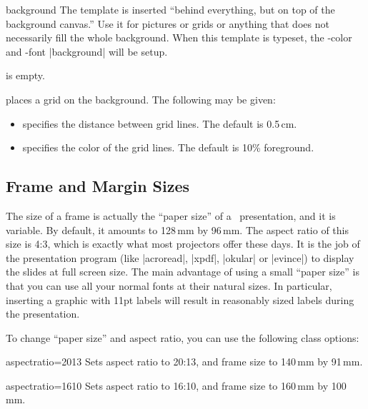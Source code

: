 \begin{element}{background}\yes\yes\yes
  The template is inserted ``behind everything, but on top of the background canvas.'' Use it for pictures or grids or anything that does not necessarily fill the whole background. When this template is typeset, the \beamer-color and -font |background| will be setup.

  \begin{templateoptions}
     is empty.

    places a grid on the background. The following  may be given:
    \begin{itemize}
      \item
       specifies the distance between grid lines. The default is 0.5\,cm.
      \item
       specifies the color of the grid lines. The default is 10\% foreground.
    \end{itemize}
  \end{templateoptions}
\end{element}


\subsection{Frame and Margin Sizes}

The size of a frame is actually the ``paper size'' of a \beamer\ presentation, and it is variable. By default, it amounts to 128\,mm by 96\,mm. The aspect ratio of this size is 4:3, which is exactly what most projectors offer these days. It is the job of the presentation program (like |acroread|, |xpdf|, |okular| or |evince|) to display the slides at full screen size. The main advantage of using a small ``paper size'' is that you can use all your normal fonts at their natural sizes. In particular, inserting a graphic with 11pt labels will result in reasonably sized labels during the presentation.

To change ``paper size'' and aspect ratio, you can use the following class options:

\begin{classoption}{aspectratio=2013}
  Sets aspect ratio to 20:13, and frame size to 140\,mm by 91\,mm.
\end{classoption}

\begin{classoption}{aspectratio=1610}
  Sets aspect ratio to 16:10, and frame size to 160\,mm by 100\,mm.
\end{classoption}

